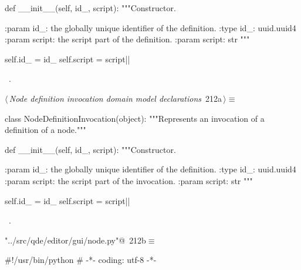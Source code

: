 \documentclass[%
    a4paper,    %
    justified,  %
    nobib,      %
    openany     %
]{tufte-book}
\makeatletter
\renewcommand{\label}[1]{\@tufte@label{##1}}%
\makeatother
\begin{document}
\begin{fullwidth}
\begin{flushleft}
\begin{minipage}{\linewidth}
\begin{pythoncode}
    def __init__(self, id_, script):
        """Constructor.

        :param id_: the globally unique identifier of the definition.
        :type  id_: uuid.uuid4
        :param script: the script part of the definition.
        :param script: str
        """

        self.id_ = id_
        self.script = script|\NWsep|
\end{pythoncode}
\vspace{1.5ex}
\footnotesize
\begin{list}{}{\setlength{\itemsep}{-\parsep}\setlength{\itemindent}{-\leftmargin}}
\item \NWtxtMacroRefIn\ .

\item{}
\end{list}
\end{minipage}\vspace{4ex}
\end{flushleft}
\begin{flushleft} \small
\begin{minipage}{\linewidth}\label{scrap212}\raggedright\small
{} $\langle\,${\itshape Node definition invocation domain model declarations}\nobreak\ {\footnotesize {212a}}$\,\rangle\equiv$
\vspace{-1ex}
\begin{pythoncode}
class NodeDefinitionInvocation(object):
    """Represents an invocation of a definition of a node."""

    def __init__(self, id_, script):
        """Constructor.

        :param id_: the globally unique identifier of the definition.
        :type  id_: uuid.uuid4
        :param script: the script part of the invocation.
        :param script: str
        """

        self.id_ = id_
        self.script = script|\NWsep|
\end{pythoncode}
\vspace{1.5ex}
\footnotesize
\begin{list}{}{\setlength{\itemsep}{-\parsep}\setlength{\itemindent}{-\leftmargin}}
\item \NWtxtMacroRefIn\ .

\item{}
\end{list}
\end{minipage}\vspace{4ex}
\end{flushleft}
\begin{flushleft} \small
\begin{minipage}{\linewidth}\label{scrap213}\raggedright\small
{} \verb@"../src/qde/editor/gui/node.py"@\nobreak\ {\footnotesize {212b}}$\equiv$
\vspace{-1ex}
\begin{pythoncode}
#!/usr/bin/python
# -*- coding: utf-8 -*-


\end{pythoncode}
\end{minipage}
\end{flushleft}
\end{fullwidth}
\end{document}

